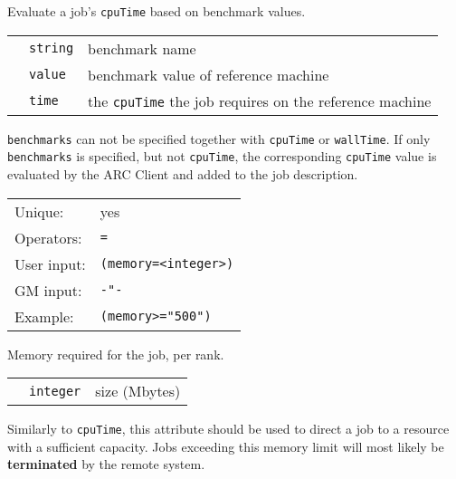   Evaluate a job's \texttt{cpuTime} based on benchmark values.

  \begin{tabular}{llp{10cm}}
    \hspace*{1cm}&\texttt{string} & benchmark name\\
    \hspace*{1cm}&\texttt{value} & benchmark value of reference machine\\
    \hspace*{1cm}&\texttt{time} & the \texttt{cpuTime} the job requires on the reference machine\\
  \end{tabular}
  
  \texttt{benchmarks} can not be specified together with \texttt{cpuTime}
  or \texttt{wallTime}. If only \texttt{benchmarks} is specified, but not \texttt{cpuTime},
  the corresponding  \texttt{cpuTime} value is evaluated by the ARC Client and added to the job description.

  \hspace*{0.5cm}
  \begin{shaded}
  \end{shaded}
  \begin{tabular}{lp{13cm}}
    Unique:&yes\\
    Operators:&\verb#=#\\
    User input:&\verb#(memory=<integer>)#\\
    GM input:&\verb#-"-#\\
    Example:&\verb#(memory>="500")#\\
  \end{tabular}

  Memory required for the job, per rank.

  \begin{tabular}{llp{10cm}}
    \hspace*{1cm}&\texttt{integer} & size (Mbytes)\\
  \end{tabular}

  \begin{framed}
    Similarly to \texttt{cpuTime}, this attribute should be used to
    direct a job to a resource with a sufficient capacity. Jobs
    exceeding this memory limit will most likely be \textbf{terminated}
    by the remote system.
  \end{framed}

